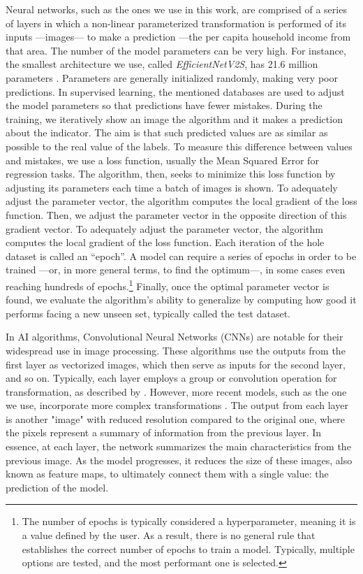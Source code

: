\documentclass[conference]{IEEEtran}
\begin{document}
Neural networks, such as the ones we use in this work, are comprised of a series of layers in which a non-linear parameterized transformation is performed of its inputs ---images--- to make a prediction ---the per capita household income from that area. The number of the model parameters can be very high. For instance, the smallest architecture we use, called \textit{EfficientNetV2S}, has 21.6 million parameters \citep{EfficientNetV2}. Parameters are generally initialized randomly, making very poor predictions. In supervised learning, the mentioned databases are used to adjust the model parameters so that predictions have fewer mistakes. During the training, we iteratively show an image the algorithm and it makes a prediction about the indicator. The aim is that such predicted values are as similar as possible to the real value of the labels. To measure this difference between values and mistakes, we use a loss function, usually the Mean Squared Error for regression tasks. The algorithm, then, seeks to minimize this loss function by adjusting its parameters each time a batch of images is shown. To adequately adjust the parameter vector, the algorithm computes the local gradient of the loss function. Then, we adjust the parameter vector in the opposite direction of this gradient vector. To adequately adjust the parameter vector, the algorithm computes the local gradient of the loss function. Each iteration of the hole dataset is called an “epoch”. A model can require a series of epochs in order to be trained ---or, in more general terms, to find the optimum---, in some cases even reaching hundreds of epochs.\footnote{The number of epochs is typically considered a hyperparameter, meaning it is a value defined by the user. As a result, there is no general rule that establishes the correct number of epochs to train a model. Typically, multiple options are tested, and the most performant one is selected.} Finally, once the optimal parameter vector is found, we evaluate the algorithm's ability to generalize by computing how good it performs facing a new unseen set, typically called the test dataset.

In AI algorithms, Convolutional Neural Networks (CNNs) are notable for their widespread use in image processing. These algorithms use the outputs from the first layer as vectorized images, which then serve as inputs for the second layer, and so on. Typically, each layer employs a group or convolution operation for transformation, as described by \citep{Goodfellow-et-al-2016}. However, more recent models, such as the one we use, incorporate more complex transformations \citep{EfficientNetV2}. The output from each layer is another "image" with reduced resolution compared to the original one, where the pixels represent a summary of information from the previous layer. In essence, at each layer, the network summarizes the main characteristics from the previous image. As the model progresses, it reduces the size of these images, also known as feature maps, to ultimately connect them with a single value: the prediction of the model.
\end{document}
